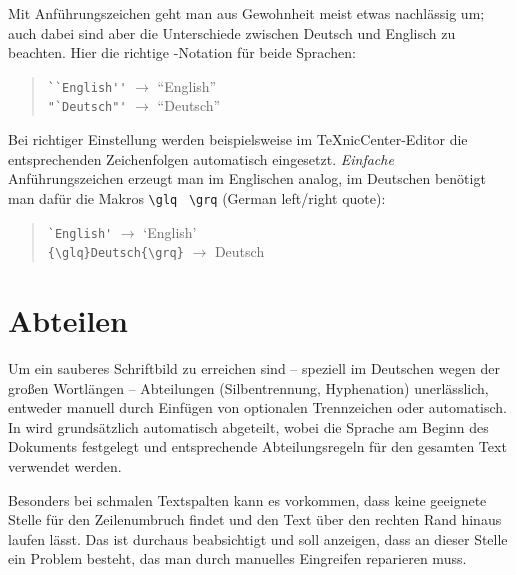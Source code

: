 Mit Anführungszeichen geht man aus Gewohnheit meist etwas
nachlässig um; auch dabei sind aber die Unterschiede zwischen Deutsch
und Englisch zu beachten. Hier die richtige \latex-Notation für
beide Sprachen:
%
\begin{quote}
\verb!``English''! $\rightarrow$ ``English'' \\
\verb!"`Deutsch"'! $\rightarrow$ "`Deutsch"' 
\end{quote}
%
Bei richtiger Einstellung werden beispielsweise im TeXnicCenter-Editor
die entsprechenden Zeichenfolgen automatisch eingesetzt.
\emph{Einfache} Anführungszeichen erzeugt man im Englischen analog, im Deutschen benötigt man dafür die Makros \verb!\glq! \bzw\ \verb!\grq! (German left/right quote):
\begin{quote}
\verb!`English'! $\rightarrow$ `English' \\
\verb!{\glq}Deutsch{\grq}! $\rightarrow$ {\glq}Deutsch{\grq} 
\end{quote}





\section{Abteilen}
\label{subsec:layout-abteilen}

Um ein sauberes Schriftbild zu erreichen sind -- speziell im
Deutschen wegen der großen Wortlängen -- Abteilungen
(Silbentrennung, Hyphenation) unerlässlich, entweder manuell durch
Einfügen von optionalen Trennzeichen oder automatisch. In \latex
wird grundsätzlich automatisch abgeteilt, wobei die Sprache am
Beginn des Dokuments festgelegt und entsprechende Abteilungsregeln
für den gesamten Text verwendet werden.

Besonders bei schmalen Textspalten kann es vorkommen, dass \latex
keine geeignete Stelle für den Zeilenumbruch findet und den Text
über den rechten Rand hinaus laufen lässt. Das ist durchaus
beabsichtigt und soll anzeigen, dass an dieser Stelle ein Problem
besteht, das man durch manuelles Eingreifen reparieren muss.

